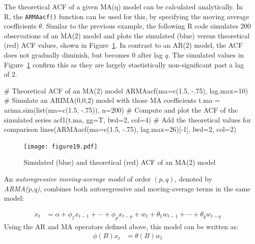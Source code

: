 

The theoretical ACF of a given MA(q) model can be calculated analytically. In R, the \texttt{ARMAacf()} function can be used for this, by specifying the moving average coefficients $\theta$. Similar to the previous example, the following R code simulates 200 observations of an MA(2) model and plots the simulated (blue) versus theoretical (red) ACF values, shown in Figure~\ref{fig:figure19}. In contrast to an AR(2) model, the ACF does not gradually diminish, but becomes 0 after lag $q$. The simulated values in Figure~\ref{fig:figure19} confirm this as they are largely stastistically non-significant past a lag of 2.

\begin{samepage}
\begin{Rcode}
# Theoretical ACF of an MA(2) model
ARMAacf(ma=c(1.5, -.75), lag.max=10)
# Simulate an ARIMA(0,0,2) model with those MA coefficients
t.ma = arima.sim(list(ma=c(1.5, -.75)), n=200)
# Compute and plot the ACF of the simulated series
acf1(t.ma, gg=T, lwd=2, col=4)
# Add the theoretical values for comparison
lines(ARMAacf(ma=c(1.5, -.75), lag.max=26)[-1], lwd=2, col=2)
\end{Rcode}
\end{samepage}

\begin{figure}
\centering
\texttt{[image: figure19.pdf]}
\caption{Simulated (blue) and theoretical (red) ACF of an MA(2) model}
\label{fig:figure19}
\end{figure}

An \emph{autoregressive moving-average model} of order $(p, q)$, denoted by \emph{ARMA(p,q)}, combines both autoregressive and moving-average terms in the same model:

\begin{align*}
x_t &= \alpha + \phi_1 x_{t-1} + \cdots + \phi_p x_{t-p} + w_t + \theta_1 w_{t-1} + \cdots + \theta_q w_{t-q} 
\end{align*}
\noindent Using the AR and MA operators defined above, this model can be written as:
\begin{align*}
\phi(B) x_t &= \theta (B) w_t 
\end{align*}


